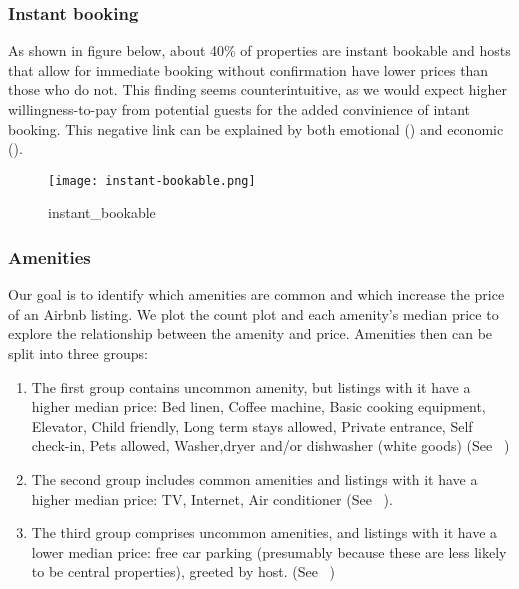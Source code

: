 \subsubsection*{Instant booking}

As shown in figure below, about 40\% of properties are instant bookable and
hosts that allow for immediate booking without confirmation  have lower prices
than those who do not. This finding seems counterintuitive, as we would expect
higher willingness-to-pay from potential guests for the added convinience of
intant booking.  This negative link can be explained by both emotional
(\textcite{wang2017price}) and economic (\textcite{benitez2018flexible}).

\begin{figure}[H]
    \centering
    \texttt{[image: instant-bookable.png]}
    \caption{instant\_bookable}
    \label{fig:instant_bookable}
\end{figure}

\subsubsection*{Amenities}

Our goal is to identify which amenities are common and which increase the price
of an Airbnb listing. We plot the count plot and each amenity's
median price to explore the relationship between the amenity and price.
Amenities then can be split into three groups:

\begin{enumerate}

  \item The first group contains uncommon amenity, but listings with it have a
    higher median price: Bed linen, Coffee machine, Basic cooking equipment,
    Elevator, Child friendly, Long term stays allowed, Private entrance, Self
    check-in, Pets allowed, Washer,dryer and/or dishwasher (white goods)
    (See
    ~)

  \item The second group includes common amenities and listings with it have a
      higher median price: TV, Internet, Air conditioner (See
      ~).

  \item The third group comprises uncommon amenities, and listings with it have
      a lower median price:  free car parking (presumably because these are less
      likely to be central properties), greeted by host. (See
      ~)

\end{enumerate}

